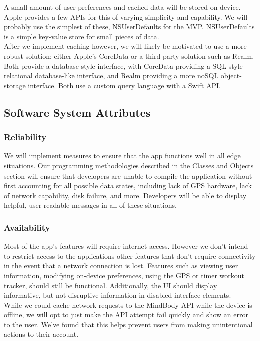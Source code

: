 \documentclass[letterpaper,10pt,titlepage]{article}
\begin{document}
A small amount of user preferences and cached data will be stored on-device. Apple provides a few APIs for this of varying simplicity and capability. We will probably use the simplest of these, NSUserDefaults for the MVP. NSUserDefaults is a simple key-value store for small pieces of data.\\

After we implement caching however, we will likely be motivated to use a more robust solution: either Apple’s CoreData or a third party solution such as Realm. Both provide a database-style interface, with CoreData providing a SQL style relational database-like interface, and Realm providing a more noSQL object-storage interface. Both use a custom query language with a Swift API.

\subsection{Software System Attributes}

\subsubsection{Reliability}

We will implement measures to ensure that the app functions well in all edge situations. Our programming methodologies described in the Classes and Objects section will ensure that developers are unable to compile the application without first accounting for all possible data states, including lack of GPS hardware, lack of network capability, disk failure, and more. Developers will be able to display helpful, user readable messages in all of these situations.

\subsubsection{Availability}

Most of the app’s features will require internet access. However we don’t intend to restrict access to the applications other features that don’t require connectivity in the event that a network connection is lost. Features such as viewing user information, modifying on-device preferences, using the GPS or timer workout tracker, should still be functional. Additionally, the UI should display informative, but not disruptive information in disabled interface elements.\\

While we could cache network requests to the MindBody API while the device is offline, we will opt to just make the API attempt fail quickly and show an error to the user. We’ve found that this helps prevent users from making unintentional actions to their account.
\end{document}
